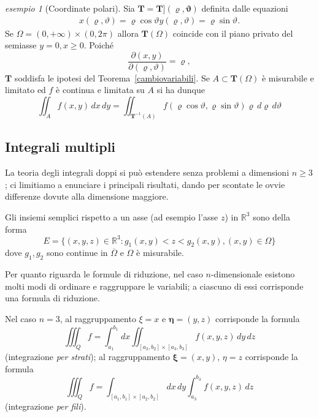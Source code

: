 \documentclass[a4paper]{book}
\numberwithin{equation}{section}
\renewcommand{\theta}{\vartheta}
\renewcommand{\rho}{\varrho}
\theoremstyle{plain}
\theoremstyle{definition}
\theoremstyle{remark}
\renewcommand{\vec}{\boldsymbol}
\theoremstyle{example}
\newtheorem{exmp}{esempio}[section]
\begin{document}
\begin{exmp}[Coordinate polari] Sia $\vec{T} = \vec{T](\rho, \theta)}$ definita dalle equazioni
		\begin{gather*}
			x(\rho, \theta) = \rho\cos\theta
			y(\rho, \theta) = \rho\sin\theta.
		\end{gather*}
	Se $\Omega = (0, +\infty) \times (0, 2\pi)$ allora $\vec{T}(\Omega)$ coincide con il piano privato del semiasse $y = 0, x \ge 0$. Poiché
		\begin{equation*}
			\frac{\partial (x, y)}{\partial (\rho, \theta)} = \rho,
		\end{equation*}
	$\vec{T}$ soddisfa le ipotesi del Teorema~\ref{cambiovariabili}. Se $A \subset \vec{T}(\Omega)$ è misurabile e limitato ed $f$ è continua e limitata su $A$ si ha dunque
		\begin{equation}
			\iint_A f(x, y) \, dx \, dy = \iint_{\vec{T}^{-1}(A)}f(\rho\cos\theta, \rho\sin\theta) \rho \, d\rho\,d\theta
		\end{equation}
\end{exmp}

\subsection{Integrali multipli}
La teoria degli integrali doppi si può estendere senza problemi a dimensioni $n \ge 3$; ci limitiamo a enunciare i principali risultati, dando per scontate le ovvie differenze dovute alla dimensione maggiore.

Gli insiemi semplici rispetto a un asse (ad esempio l'asse $z$) in $\mathbb{R}^3$ sono della forma
	\begin{equation*}
		E = \{ (x, y, z) \in \mathbb{R}^3 \colon g_1(x, y) < z < g_2(x, y), (x, y) \in \Omega \}
	\end{equation*}
dove $g_1, g_2$ sono continue in $\overline{\Omega}$ e $\Omega$ è misurabile.

Per quanto riguarda le formule di riduzione, nel caso $n$-dimensionale esistono molti modi di ordinare e raggruppare le variabili; a ciascuno di essi corrisponde una formula di riduzione.

Nel caso $n = 3$, al raggruppamento $\xi = x$ e $\vec{\eta} = (y, z)$ corrisponde la formula
	\begin{equation}
		\iiint_Q f = \int_{a_1}^{b_1} dx \iint_{[a_2, b_2]\times[a_3, b_3]} f(x, y, z)\,dy\,dz
	\end{equation}
(integrazione \emph{per strati}); al raggruppamento $\vec{\xi} = (x, y)$, $\eta = z$ corrisponde la formula
	\begin{equation}
		\label{eqn:fili}
		\iiint_Q f = \int_{[a_1, b_1]\times[a_2, b_2]} dx \, dy \int_{a_3}^{b_3}f(x, y, z)\,dz
	\end{equation}
(integrazione \emph{per fili}).
\end{document}
